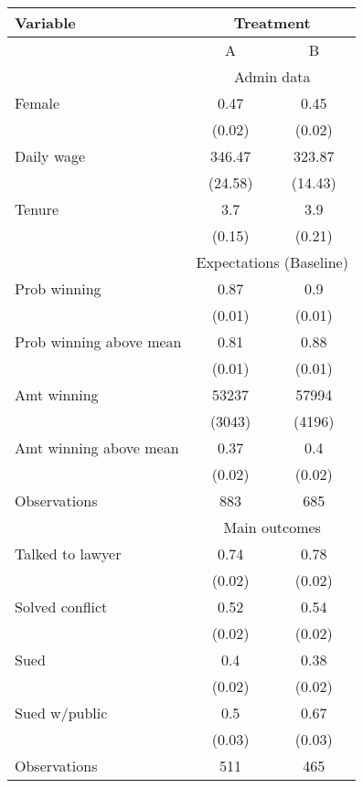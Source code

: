 \begin{tabular}{lcc}
\toprule
Variable & \multicolumn{2}{c}{Treatment} \\
\midrule
\midrule
      & A     & B \\
\midrule
      & \multicolumn{2}{c}{Admin data} \\
\midrule
\midrule
Female & 0.47  & 0.45 \\
      & (0.02) & (0.02) \\
Daily wage & 346.47 & 323.87 \\
      & (24.58) & (14.43) \\
Tenure & 3.7   & 3.9 \\
      & (0.15) & (0.21) \\
\midrule
      & \multicolumn{2}{c}{Expectations (Baseline)} \\
\midrule
\midrule
Prob winning & 0.87  & 0.9 \\
      & (0.01) & (0.01) \\
Prob winning above mean & 0.81  & 0.88 \\
      & (0.01) & (0.01) \\
Amt winning & 53237 & 57994 \\
      & (3043) & (4196) \\
Amt winning above mean & 0.37  & 0.4 \\
      & (0.02) & (0.02) \\
\midrule
Observations & 883   & 685 \\
\midrule
      & \multicolumn{2}{c}{Main outcomes} \\
\midrule
\midrule
Talked to lawyer & 0.74  & 0.78 \\
      & (0.02) & (0.02) \\
Solved conflict & 0.52  & 0.54 \\
      & (0.02) & (0.02) \\
Sued  & 0.4   & 0.38 \\
      & (0.02) & (0.02) \\
Sued w/public & 0.5   & 0.67 \\
      & (0.03) & (0.03) \\
\midrule
Observations & 511   & 465 \\
\bottomrule
\bottomrule
\end{tabular}%
